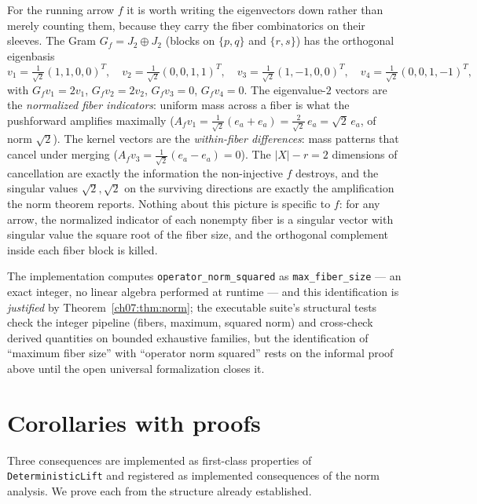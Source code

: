 \begin{example}\label{ch07:ex:eigenvectors}
For the running arrow $f$ it is worth writing the eigenvectors down rather
than merely counting them, because they carry the fiber combinatorics on
their sleeves. The Gram $G_f=J_2\oplus J_2$ (blocks on $\{p,q\}$ and
$\{r,s\}$) has the orthogonal eigenbasis
\[
v_1=\tfrac{1}{\sqrt2}(1,1,0,0)^T,\quad
v_2=\tfrac{1}{\sqrt2}(0,0,1,1)^T,\quad
v_3=\tfrac{1}{\sqrt2}(1,-1,0,0)^T,\quad
v_4=\tfrac{1}{\sqrt2}(0,0,1,-1)^T,
\]
with $G_fv_1=2v_1$, $G_fv_2=2v_2$, $G_fv_3=0$, $G_fv_4=0$. The
eigenvalue-$2$ vectors are the \emph{normalized fiber indicators}: uniform
mass across a fiber is what the pushforward amplifies maximally
($A_fv_1=\tfrac{1}{\sqrt2}(e_a+e_a)=\tfrac{2}{\sqrt2}\,e_a
=\sqrt{2}\,e_a$, of norm $\sqrt2$). The
kernel vectors are the \emph{within-fiber differences}: mass patterns that
cancel under merging ($A_fv_3=\tfrac{1}{\sqrt2}(e_a-e_a)=0$). The
$|X|-r=2$ dimensions of cancellation are exactly the information the
non-injective $f$ destroys, and the singular values $\sqrt2,\sqrt2$ on the
surviving directions are exactly the amplification the norm theorem
reports. Nothing about this picture is specific to $f$: for any arrow, the
normalized indicator of each nonempty fiber is a singular vector with
singular value the square root of the fiber size, and the orthogonal
complement inside each fiber block is killed.
\end{example}

The implementation computes \texttt{operator\_norm\_squared} as
\texttt{max\_fiber\_size} --- an exact integer, no linear algebra performed
at runtime --- and this identification is \emph{justified} by
Theorem~\ref{ch07:thm:norm}; the executable suite's structural tests check
the integer pipeline (fibers, maximum, squared norm) and cross-check derived
quantities on bounded exhaustive families, but the identification of
``maximum fiber size'' with ``operator norm squared'' rests on the informal
proof above until the open universal formalization closes it.

\section{Corollaries with proofs}\label{ch07:sec:corollaries}

Three consequences are implemented as first-class properties of
\texttt{DeterministicLift} and registered as implemented consequences of the
norm analysis. We prove each from the structure already established.


